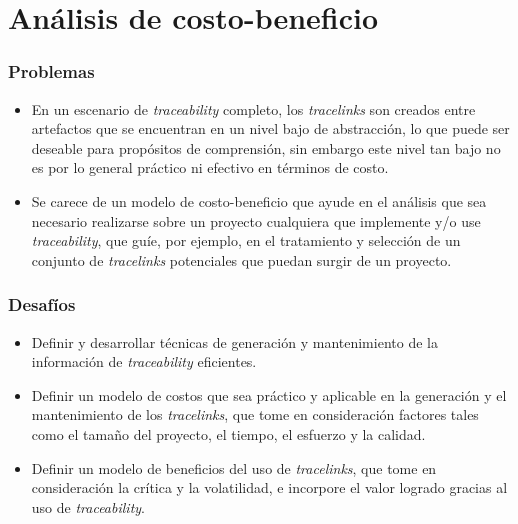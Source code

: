 \documentclass[a4paper,12pt,oneside,spanish]{book}
\begin{document}
\section{Análisis de costo-beneficio}

\subsubsection{Problemas}

\begin{itemize}[label={$\times$}]

\item En un escenario de \textit{traceability} completo, los \textit{tracelinks} son creados entre artefactos que se encuentran en un nivel bajo de abstracción, lo que puede ser deseable para propósitos de comprensión, sin embargo este nivel tan bajo no es por lo general práctico ni efectivo en términos de costo.

\item Se carece de un modelo de costo-beneficio que ayude en el análisis que sea necesario realizarse sobre un proyecto cualquiera que implemente y/o use \textit{traceability}, que guíe, por ejemplo, en el tratamiento y selección de un conjunto de \textit{tracelinks} potenciales que puedan surgir de un proyecto.

\end{itemize}

\subsubsection{Desafíos}

\begin{itemize}[label={\checkmark}]

\item Definir y desarrollar técnicas de generación y mantenimiento de la información de \textit{traceability} eficientes.

\item Definir un modelo de costos que sea práctico y aplicable en la generación y el mantenimiento de los \textit{tracelinks}, que tome en consideración factores tales como el tamaño del proyecto, el tiempo, el esfuerzo y la calidad.

\item Definir un modelo de beneficios del uso de \textit{tracelinks}, que tome en consideración la crítica y la volatilidad, e incorpore el valor logrado gracias al uso de \textit{traceability}.

\end{itemize}
\end{document}
